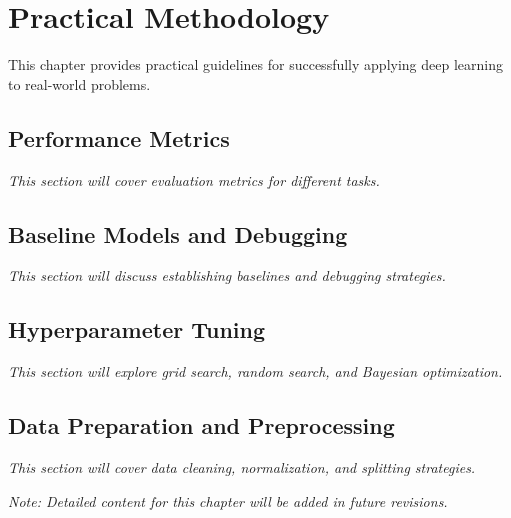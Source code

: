 
\chapter{Practical Methodology}
\label{chap:practical-methodology}

This chapter provides practical guidelines for successfully applying deep learning to real-world problems.

\section{Performance Metrics}

\textit{This section will cover evaluation metrics for different tasks.}

\section{Baseline Models and Debugging}

\textit{This section will discuss establishing baselines and debugging strategies.}

\section{Hyperparameter Tuning}

\textit{This section will explore grid search, random search, and Bayesian optimization.}

\section{Data Preparation and Preprocessing}

\textit{This section will cover data cleaning, normalization, and splitting strategies.}

\vspace{1em}
\noindent\textit{Note: Detailed content for this chapter will be added in future revisions.}
